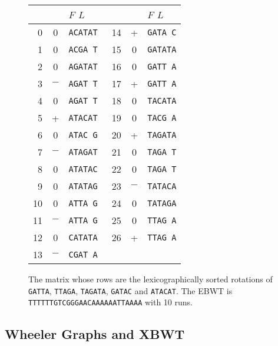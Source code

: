\begin{figure}[t]
\begin{center}
\begin{tabular}{rcl@{\hspace{6ex}}rcl}
&& $F$ \hspace{2.7ex} $L$ &&& $F$ \hspace{2.7ex} $L$\\
\hline
 0 & 0 & \tt ACATAT  & 14 & + & \tt GATA\ C\\
 1 & 0 & \tt ACGA\ T & 15 & 0 & \tt GATATA\\
 2 & 0 & \tt AGATAT  & 16 & 0 & \tt GATT\ A\\
 3 & $-$& \tt AGAT\ T &  17 & + & \tt GATT\ A\\
 4 & 0 & \tt AGAT\ T & 18 & 0 & \tt TACATA\\
 5 & + & \tt ATACAT  & 19 & 0 & \tt TACG\ A\\
 6 & 0 & \tt ATAC\ G & 20 & + & \tt TAGATA\\
 7 &$-$& \tt ATAGAT  & 21 & 0 & \tt TAGA\ T\\
 8 & 0 & \tt ATATAC  & 22 & 0 & \tt TAGA\ T\\
 9 & 0 & \tt ATATAG  & 23 &$-$& \tt TATACA\\
10 & 0 & \tt ATTA\ G & 24 & 0 & \tt TATAGA\\
11 &$-$& \tt ATTA\ G & 25 & 0 & \tt TTAG\ A\\
12 & 0 & \tt CATATA  & 26 & + & \tt TTAG\ A\\
13 &$-$& \tt CGAT\ A &    &\\
\end{tabular}
\caption{The matrix whose rows are the lexicographically sorted rotations of {\tt GATTA}, {\tt TTAGA}, {\tt TAGATA}, {\tt GATAC} and {\tt ATACAT}.  The EBWT is {\tt TTTTTTGTCGGGAACAAAAAATTAAAA} with 10 runs.}
\label{fig:dollarless}
\end{center}
\end{figure}


\subsection{Wheeler Graphs and XBWT}
\label{subsec:WG}

